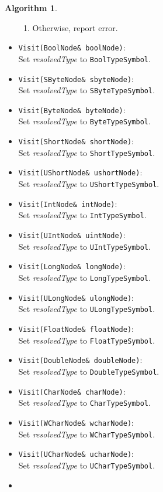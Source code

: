 \documentclass[a4paper,oneside,11pt]{book}
\theoremstyle{definition}
\newtheorem{algo}{Algorithm}[section]
\begin{document}
\begin{algo}
\begin{itemize}
\begin{enumerate}
\item
Otherwise, report error.
\end{enumerate}
\item
\verb|Visit(BoolNode& boolNode)|:\\
Set \emph{resolvedType} to \verb|BoolTypeSymbol|.
\item
\verb|Visit(SByteNode& sbyteNode)|:\\
Set \emph{resolvedType} to \verb|SByteTypeSymbol|.
\item
\verb|Visit(ByteNode& byteNode)|:\\
Set \emph{resolvedType} to \verb|ByteTypeSymbol|.
\item
\verb|Visit(ShortNode& shortNode)|:\\
Set \emph{resolvedType} to \verb|ShortTypeSymbol|.
\item
\verb|Visit(UShortNode& ushortNode)|:\\
Set \emph{resolvedType} to \verb|UShortTypeSymbol|.
\item
\verb|Visit(IntNode& intNode)|:\\
Set \emph{resolvedType} to \verb|IntTypeSymbol|.
\item
\verb|Visit(UIntNode& uintNode)|:\\
Set \emph{resolvedType} to \verb|UIntTypeSymbol|.
\item
\verb|Visit(LongNode& longNode)|:\\
Set \emph{resolvedType} to \verb|LongTypeSymbol|.
\item
\verb|Visit(ULongNode& ulongNode)|:\\
Set \emph{resolvedType} to \verb|ULongTypeSymbol|.
\item
\verb|Visit(FloatNode& floatNode)|:\\
Set \emph{resolvedType} to \verb|FloatTypeSymbol|.
\item
\verb|Visit(DoubleNode& doubleNode)|:\\
Set \emph{resolvedType} to \verb|DoubleTypeSymbol|.
\item
\verb|Visit(CharNode& charNode)|:\\
Set \emph{resolvedType} to \verb|CharTypeSymbol|.
\item
\verb|Visit(WCharNode& wcharNode)|:\\
Set \emph{resolvedType} to \verb|WCharTypeSymbol|.
\item
\verb|Visit(UCharNode& ucharNode)|:\\
Set \emph{resolvedType} to \verb|UCharTypeSymbol|.
\item

\end{itemize}
\end{algo}
\end{document}

